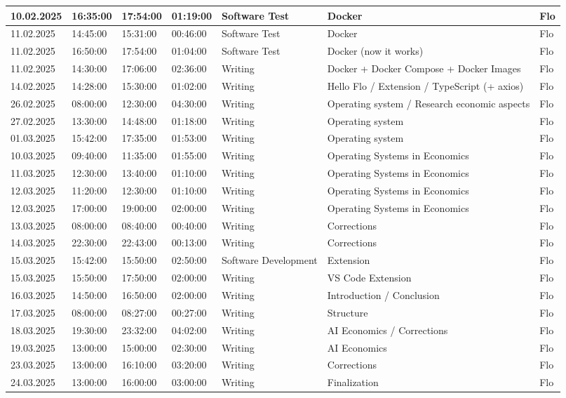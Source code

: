 \begin{longtable}{@{}p{1.3cm} p{1cm} p{1cm} p{1cm} p{1.5cm} p{4.5cm} p{1.2cm}@{}}
    \hline
    10.02.2025 & 16:35:00 & 17:54:00 & 01:19:00 & Software Test & Docker & Flo \\
    \hline
    11.02.2025 & 14:45:00 & 15:31:00 & 00:46:00 & Software Test & Docker & Flo \\
    \hline
    11.02.2025 & 16:50:00 & 17:54:00 & 01:04:00 & Software Test & Docker (now it works) & Flo \\
    \hline
    11.02.2025 & 14:30:00 & 17:06:00 & 02:36:00 & Writing & Docker + Docker Compose + Docker Images & Flo \\
    \hline
    14.02.2025 & 14:28:00 & 15:30:00 & 01:02:00 & Writing & Hello Flo / Extension / TypeScript (+ axios) & Flo \\
    \hline
    26.02.2025 & 08:00:00 & 12:30:00 & 04:30:00 & Writing & Operating system / Research economic aspects & Flo \\
    \hline
    27.02.2025 & 13:30:00 & 14:48:00 & 01:18:00 & Writing & Operating system & Flo \\
    \hline
    01.03.2025   & 15:42:00 & 17:35:00 & 01:53:00 & Writing & Operating system & Flo \\
    \hline
    10.03.2025   & 09:40:00 & 11:35:00 & 01:55:00 & Writing & Operating Systems in Economics & Flo \\
    \hline
    11.03.2025   & 12:30:00 & 13:40:00 & 01:10:00 & Writing & Operating Systems in Economics & Flo \\
    \hline
    12.03.2025   & 11:20:00 & 12:30:00 & 01:10:00 & Writing & Operating Systems in Economics & Flo \\
    \hline
    12.03.2025   & 17:00:00 & 19:00:00 & 02:00:00 & Writing & Operating Systems in Economics & Flo \\
    \hline
    13.03.2025   & 08:00:00 & 08:40:00 & 00:40:00 & Writing & Corrections & Flo \\
    \hline
    14.03.2025   & 22:30:00 & 22:43:00 & 00:13:00 & Writing & Corrections & Flo \\
    \hline
    15.03.2025   & 15:42:00 & 15:50:00 & 02:50:00 & Software Development & Extension & Flo \\
    \hline
    15.03.2025   & 15:50:00 & 17:50:00 & 02:00:00 & Writing & VS Code Extension & Flo \\
    \hline
    16.03.2025   & 14:50:00 & 16:50:00 & 02:00:00 & Writing & Introduction / Conclusion& Flo \\
    \hline
    17.03.2025   & 08:00:00 & 08:27:00 & 00:27:00 & Writing & Structure & Flo \\
    \hline
    18.03.2025   & 19:30:00 & 23:32:00 & 04:02:00 & Writing & AI Economics / Corrections & Flo \\
    \hline
    19.03.2025   & 13:00:00 & 15:00:00 & 02:30:00 & Writing & AI Economics & Flo \\
    \hline
    23.03.2025   & 13:00:00 & 16:10:00 & 03:20:00 & Writing & Corrections & Flo \\
    \hline
    24.03.2025   & 13:00:00 & 16:00:00 & 03:00:00 & Writing & Finalization & Flo \\
    \hline

    


\end{longtable}
